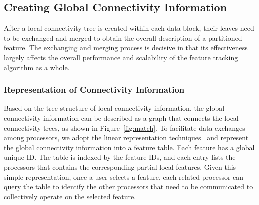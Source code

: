 %
% 			
%
%

\subsection{Creating Global Connectivity Information}

After a local connectivity tree is created within each data block, their leaves need to be exchanged and merged to obtain the overall description of a partitioned feature. The exchanging and merging process is decisive in that its effectiveness largely affects the overall performance and scalability of the feature tracking algorithm as a whole.

\subsubsection{Representation of Connectivity Information}

Based on the tree structure of local connectivity information, the global connectivity information can be described as a graph that connects the local connectivity trees, as shown in Figure~\ref{fig:match}. To facilitate data exchanges among processors, we adopt the linear representation techniques~\cite{AMET1990} and represent the global connectivity information into a feature table. Each feature has a global unique ID. The table is indexed by the feature IDs, and each entry lists the processors that contains the corresponding partial local features. Given this simple representation, once a user selects a feature, each related processor can query the table to identify the other processors that need to be communicated to collectively operate on the selected feature.

